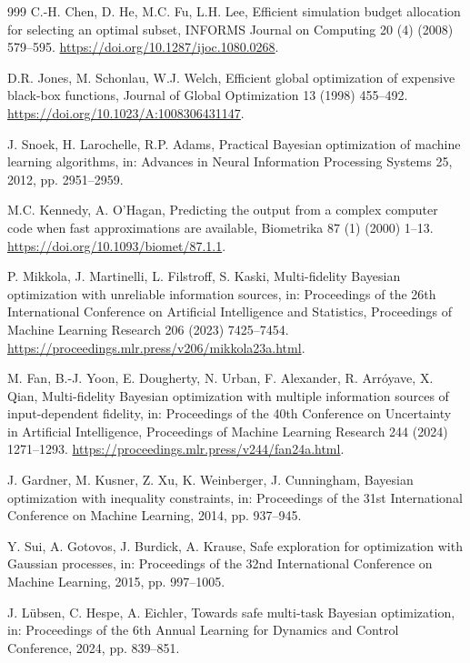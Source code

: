 \documentclass[futureinternet,article,submit,moreauthors]{Definitions/mdpi}
\begin{document}
\begin{thebibliography}{999}
C.-H. Chen, D. He, M.C. Fu, L.H. Lee,
Efficient simulation budget allocation for selecting an optimal subset,
INFORMS Journal on Computing 20 (4) (2008) 579--595.
\newblock \url{https://doi.org/10.1287/ijoc.1080.0268}.

D.R. Jones, M. Schonlau, W.J. Welch,
Efficient global optimization of expensive black-box functions,
Journal of Global Optimization 13 (1998) 455--492.
\newblock \url{https://doi.org/10.1023/A:1008306431147}.

J. Snoek, H. Larochelle, R.P. Adams,
Practical Bayesian optimization of machine learning algorithms,
in: Advances in Neural Information Processing Systems 25, 2012, pp. 2951--2959.

M.C. Kennedy, A. O'Hagan,
Predicting the output from a complex computer code when fast approximations are available,
Biometrika 87 (1) (2000) 1--13.
\newblock \url{https://doi.org/10.1093/biomet/87.1.1}.

P. Mikkola, J. Martinelli, L. Filstroff, S. Kaski,
Multi-fidelity Bayesian optimization with unreliable information sources,
in: Proceedings of the 26th International Conference on Artificial Intelligence and Statistics,
Proceedings of Machine Learning Research 206 (2023) 7425--7454.
\newblock \url{https://proceedings.mlr.press/v206/mikkola23a.html}.

M. Fan, B.-J. Yoon, E. Dougherty, N. Urban, F. Alexander, R. Arr\'oyave, X. Qian,
Multi-fidelity Bayesian optimization with multiple information sources of input-dependent fidelity,
in: Proceedings of the 40th Conference on Uncertainty in Artificial Intelligence,
Proceedings of Machine Learning Research 244 (2024) 1271--1293.
\newblock \url{https://proceedings.mlr.press/v244/fan24a.html}.

J. Gardner, M. Kusner, Z. Xu, K. Weinberger, J. Cunningham,
Bayesian optimization with inequality constraints,
in: Proceedings of the 31st International Conference on Machine Learning, 2014, pp. 937--945.

Y. Sui, A. Gotovos, J. Burdick, A. Krause,
Safe exploration for optimization with Gaussian processes,
in: Proceedings of the 32nd International Conference on Machine Learning, 2015, pp. 997--1005.

J. L{\"u}bsen, C. Hespe, A. Eichler,
Towards safe multi-task Bayesian optimization,
in: Proceedings of the 6th Annual Learning for Dynamics and Control Conference, 2024, pp. 839--851.


\end{thebibliography}
\end{document}
